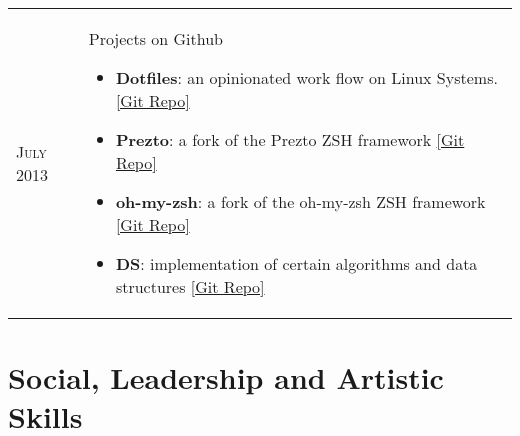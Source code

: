 \documentclass[a4paper,10pt]{article} %
\newcommand{\projectlist}[3]{
    \begin{tabular}{>{\raggedleft}p{2.2cm}|p{17cm}}
        \textsc{#1} & #2
                    \footnotesize{#3}
    \end{tabular}
}
\begin{document}
\projectlist {July 2013}
         {Projects on Github}
         {
             \begin{itemize}[leftmargin=*]
                 \item \textbf{Dotfiles}: an opinionated work flow on Linux Systems.
                     \href{https://github.com/srijanshetty/dotfiles} {[Git Repo]}
                 \item \textbf{Prezto}: a fork of the Prezto ZSH framework
                     \href{https://github.com/srijanshetty/prezto} {[Git Repo]}
                 \item \textbf{oh-my-zsh}: a fork of the oh-my-zsh ZSH framework
                     \href{https://github.com/srijanshetty/oh-my-zsh} {[Git Repo]}
                 \item \textbf{DS}: implementation of certain algorithms and data structures
                     \href{https://github.com/srijanshetty/DS} {[Git Repo]}
             \end{itemize}
         }


\section {Social, Leadership and Artistic Skills}
\end{document}
